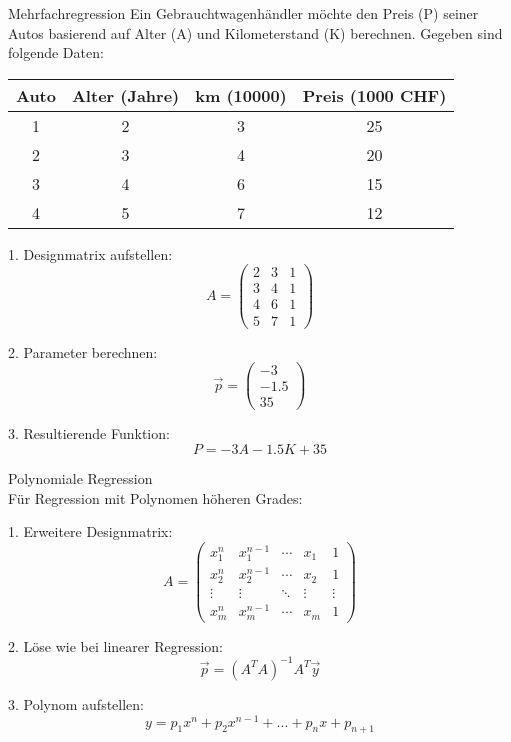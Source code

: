 \begin{example2}{Mehrfachregression}
Ein Gebrauchtwagenhändler möchte den Preis (P) seiner Autos basierend auf Alter (A) und Kilometerstand (K) berechnen.
Gegeben sind folgende Daten:

\begin{center}
\begin{tabular}{|c|c|c|c|}
\hline
Auto & Alter (Jahre) & km (10000) & Preis (1000 CHF) \\
\hline
1 & 2 & 3 & 25 \\
2 & 3 & 4 & 20 \\
3 & 4 & 6 & 15 \\
4 & 5 & 7 & 12 \\
\hline
\end{tabular}
\end{center}

1. Designmatrix aufstellen:
   $$A = \begin{pmatrix}
   2 & 3 & 1 \\
   3 & 4 & 1 \\
   4 & 6 & 1 \\
   5 & 7 & 1
   \end{pmatrix}$$

2. Parameter berechnen:
   $$\vec{p} = \begin{pmatrix} -3 \\ -1.5 \\ 35 \end{pmatrix}$$

3. Resultierende Funktion:
   $$P = -3A - 1.5K + 35$$
\end{example2}

\begin{KR}{Polynomiale Regression}\\
Für Regression mit Polynomen höheren Grades:

1. Erweitere Designmatrix:
   $$A = \begin{pmatrix}
   x_1^n & x_1^{n-1} & \cdots & x_1 & 1 \\
   x_2^n & x_2^{n-1} & \cdots & x_2 & 1 \\
   \vdots & \vdots & \ddots & \vdots & \vdots \\
   x_m^n & x_m^{n-1} & \cdots & x_m & 1
   \end{pmatrix}$$

2. Löse wie bei linearer Regression:
   $$\vec{p} = (A^T A)^{-1} A^T \vec{y}$$

3. Polynom aufstellen:
   $$y = p_1x^n + p_2x^{n-1} + ... + p_nx + p_{n+1}$$
\end{KR}

